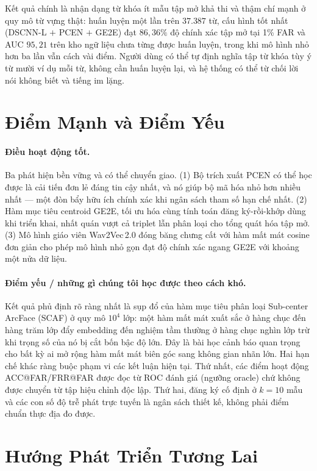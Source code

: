 \documentclass[12pt,a4paper]{report}
\begin{document}
Kết quả chính là nhận dạng từ khóa ít mẫu tập mở khả thi và thậm chí mạnh ở quy
mô từ vựng thật: huấn luyện một lần trên $37{.}387$ từ, cấu hình tốt nhất
(DSCNN-L $+$ PCEN $+$ GE2E) đạt $86{,}36\%$ độ chính xác tập mở tại 1\% FAR và
AUC $95{,}21$ trên kho ngữ liệu chưa từng được huấn luyện, trong khi mô hình nhỏ
hơn ba lần vẫn cách vài điểm. Người dùng có thể tự định nghĩa tập từ khóa tùy ý
từ mười ví dụ mỗi từ, không cần huấn luyện lại, và hệ thống có thể từ chối lời
nói không biết và tiếng im lặng.

\section{Điểm Mạnh và Điểm Yếu}\label{sec:goodbad}

\paragraph{Điều hoạt động tốt.} Ba phát hiện bền vững và có thể chuyển giao.
(1) Bộ trích xuất PCEN có thể học được là cải tiến đơn lẻ đáng tin cậy nhất, và
nó giúp bộ mã hóa nhỏ hơn nhiều nhất --- một đòn bẩy hữu ích chính xác khi ngân
sách tham số hạn chế nhất. (2) Hàm mục tiêu centroid GE2E, tối ưu hóa cùng tính
toán đăng ký-rồi-khớp dùng khi triển khai, nhất quán vượt cả triplet lẫn phân
loại cho tổng quát hóa tập mở. (3) Mô hình giáo viên Wav2Vec\,2.0 đóng băng chưng
cất với hàm mất mát cosine đơn giản cho phép mô hình nhỏ gọn đạt độ chính xác
ngang GE2E với khoảng một nửa dữ liệu.

\paragraph{Điểm yếu / những gì chúng tôi học được theo cách khó.} Kết quả phủ
định rõ ràng nhất là sụp đổ của hàm mục tiêu phân loại Sub-center ArcFace (SCAF)
ở quy mô $10^4$ lớp: một hàm mất mát xuất sắc ở hàng chục đến hàng trăm lớp đẩy
embedding đến nghiệm tầm thường ở hàng chục nghìn lớp trừ khi trọng số của nó bị
cắt bốn bậc độ lớn. Đây là bài học cảnh báo quan trọng cho bất kỳ ai mở rộng hàm
mất mát biên góc sang không gian nhãn lớn. Hai hạn chế khác ràng buộc phạm vi các
kết luận hiện tại. Thứ nhất, các điểm hoạt động ACC@FAR/FRR@FAR được đọc từ ROC đánh giá
(ngưỡng oracle) chứ không được chuyển từ tập hiệu chỉnh độc lập. Thứ hai, đăng ký
cố định ở $k{=}10$ mẫu và các con số độ trễ phát trực tuyến là ngân sách thiết kế,
không phải điểm chuẩn thực địa đo được.

\section{Hướng Phát Triển Tương Lai}\label{sec:future}
\end{document}
